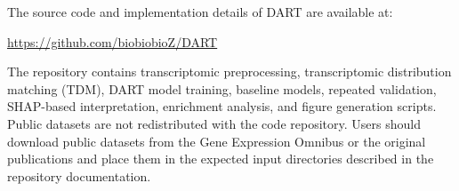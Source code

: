 The source code and implementation details of DART are available at:

\url{https://github.com/biobiobioZ/DART}

The repository contains transcriptomic preprocessing, transcriptomic distribution matching (TDM), DART model training, baseline models, repeated validation, SHAP-based interpretation, enrichment analysis, and figure generation scripts. Public datasets are not redistributed with the code repository. Users should download public datasets from the Gene Expression Omnibus or the original publications and place them in the expected input directories described in the repository documentation.

